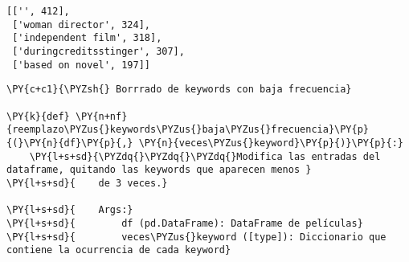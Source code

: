             \begin{tcolorbox}[breakable, size=fbox, boxrule=.5pt, pad at break*=1mm, opacityfill=0]
\begin{Verbatim}[commandchars=\\\{\}]
[['', 412],
 ['woman director', 324],
 ['independent film', 318],
 ['duringcreditsstinger', 307],
 ['based on novel', 197]]
\end{Verbatim}
\end{tcolorbox}
        
    \begin{tcolorbox}[breakable, size=fbox, boxrule=1pt, pad at break*=1mm,colback=cellbackground, colframe=cellborder]
\begin{Verbatim}[commandchars=\\\{\}]
\PY{c+c1}{\PYZsh{} Borrrado de keywords con baja frecuencia}

\PY{k}{def} \PY{n+nf}{reemplazo\PYZus{}keywords\PYZus{}baja\PYZus{}frecuencia}\PY{p}{(}\PY{n}{df}\PY{p}{,} \PY{n}{veces\PYZus{}keyword}\PY{p}{)}\PY{p}{:}
    \PY{l+s+sd}{\PYZdq{}\PYZdq{}\PYZdq{}Modifica las entradas del dataframe, quitando las keywords que aparecen menos }
\PY{l+s+sd}{    de 3 veces.}

\PY{l+s+sd}{    Args:}
\PY{l+s+sd}{        df (pd.DataFrame): DataFrame de películas}
\PY{l+s+sd}{        veces\PYZus{}keyword ([type]): Diccionario que contiene la ocurrencia de cada keyword}


\end{Verbatim}
\end{tcolorbox}
